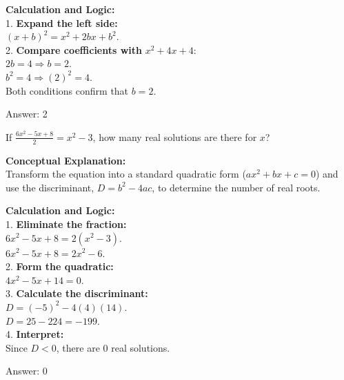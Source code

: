 \documentclass[11pt,paper=a4,answers]{exam}
\begin{document}
\begin{questions}
\begin{solution}
\textbf{Calculation and Logic:} \\
1. \textbf{Expand the left side:} \\
$(x+b)^2 = x^2 + 2bx + b^2$. \\
2. \textbf{Compare coefficients with } $x^2 + 4x + 4$: \\
$2b = 4 \Rightarrow b = 2$. \\
$b^2 = 4 \Rightarrow (2)^2 = 4$. \\
Both conditions confirm that $b = 2$.

\vspace{30pt}

Answer: \colorbox{yellow!100}{2}
\end{solution}

\vspace{60pt}

\question
If $\frac{6x^2 - 5x + 8}{2} = x^2 - 3$, how many real solutions are there for $x$?

\begin{solution}
\textbf{Conceptual Explanation:} \\
Transform the equation into a standard quadratic form ($ax^2 + bx + c = 0$) and use the discriminant, $D = b^2 - 4ac$, to determine the number of real roots.

\vspace{30pt}

\textbf{Calculation and Logic:} \\
1. \textbf{Eliminate the fraction:} \\
$6x^2 - 5x + 8 = 2(x^2 - 3)$. \\
$6x^2 - 5x + 8 = 2x^2 - 6$. \\
2. \textbf{Form the quadratic:} \\
$4x^2 - 5x + 14 = 0$. \\
3. \textbf{Calculate the discriminant:} \\
$D = (-5)^2 - 4(4)(14)$. \\
$D = 25 - 224 = -199$. \\
4. \textbf{Interpret:} \\
Since $D < 0$, there are 0 real solutions.

\vspace{30pt}

Answer: \colorbox{yellow!100}{0}
\end{solution}

\vspace{60pt}


\end{questions}
\end{document}
